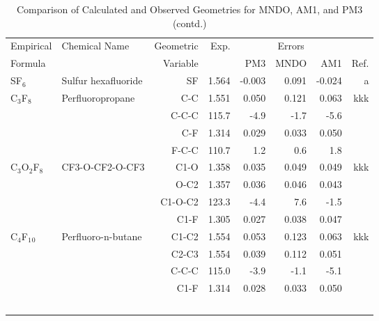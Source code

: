 \begin{table}
\caption{\label{geotabj}Comparison of Calculated and Observed Geometries for 
MNDO, AM1, and PM3 (contd.)}
\begin{center}
\compresstable
\begin{tabular}{llrrrrrr}
 Empirical  & Chemical Name &  Geometric &  Exp. & \multicolumn{3}{c}{Errors} & \\
  Formula   &               &  Variable &        & PM3  & MNDO  &  AM1 & Ref.\\
\hline
 SF$_6$         & Sulfur hexafluoride                &SF            &     1.564   &    -0.003 &     0.091 &    -0.024 &     a \\
 C$_3$F$_8$        & Perfluoropropane                   &C-C           &     1.551   &     0.050 &     0.121 &     0.063 &   kkk \\
             &                                    &C-C-C       &     115.7   &      -4.9 &      -1.7 &      -5.6   &       \\
             &                                    &C-F           &     1.314   &     0.029 &     0.033 &     0.050 &       \\
             &                                    &F-C-C       &     110.7   &       1.2 &       0.6 &       1.8   &       \\
 C$_3$O$_2$F$_8$      & CF3-O-CF2-O-CF3                    &C1-O          &     1.358   &     0.035 &     0.049 &     0.049 &   kkk \\
             &                                    &O-C2          &     1.357   &     0.036 &     0.046 &     0.043 &       \\
             &                                    &C1-O-C2     &     123.3   &      -4.4 &       7.6 &      -1.5   &       \\
             &                                    &C1-F          &     1.305   &     0.027 &     0.038 &     0.047 &       \\
 C$_4$F$_1$$_0$       & Perfluoro-n-butane                 &C1-C2         &     1.554   &     0.053 &     0.123 &     0.063 &   kkk \\
             &                                    &C2-C3         &     1.554   &     0.039 &     0.112 &     0.051 &       \\
             &                                    &C-C-C       &     115.0   &      -3.9 &      -1.1 &      -5.1   &       \\
             &                                    &C1-F          &     1.314   &     0.028 &     0.033 &     0.050 &       \\
$$
\end{tabular}
\end{center}
\end{table}
